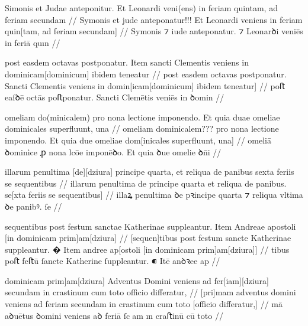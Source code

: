 \ex \bg
\gla
{}
Simonis et Judae anteponitur.
Et Leonardi veni(ens) in feriam quintam, ad feriam secundam
//
\glRekonstrukcja
{}
Symonis et jude anteponatur!!!
Et Leonardi veniens in feriam quin[tam, ad feriam secundam]
//
\glU
{}
Symonis ⁊ iude anteponatur. ⁊ Leonarꝺi veniēs in feriā quın   
//
\endgl
\eg


\ex \bg
\gla
{}
post easdem octavas postponatur.
Item sancti Clementis veniens in dominicam[dominicum] ibidem teneatur
//
\glRekonstrukcja
{}
post easdem octavas postponatur.
{} Sancti Clementis veniens in domin[icam[dominicum] ibidem teneatur]
//
\glU
{}
poﬅ eaſꝺē octās poﬅponatur. {} Sancti Clemētis veniēs in ꝺomin  
//
\endgl
\eg


\ex \bg
\gla
{}
omeliam do(minicalem) pro nona lectione imponendo. Et quia duae
omeliae dominicales superfluunt, una 
//
\glRekonstrukcja
{}
omeliam dominicalem??? pro nona lectione imponendo. Et quia due
omeliae dom[inicales superfluunt, una]
//
\glU
{}
omeliā ꝺominìce ꝓ nona lcōe imponēꝺo. Et quia ꝺue omelie ꝺn̄i  
//
\endgl
\eg




\ex \bg
\gla
{}
illarum penultima [de][dziura] principe
quarta, et reliqua de panibus sexta feriis se sequentibus
//
\glRekonstrukcja
{}
illarum penultima de principe
quarta et reliqua de panibus. se[xta feriis se sequentibus]
//
\glU
{}
illaꝝ penultima ꝺe pꝛincipe quarta ⁊ reliqua vltima ꝺe panibꝰ. ſe   
//
\endgl
\eg



\ex \bg
\gla
{}
sequentibus post festum
sanctae Katherinae suppleantur.
{} Item Andreae apostoli [in dominicam prim]am[dziura]
//
\glRekonstrukcja
{}
[sequen]tibus post festum
sancte Katherinae suppleantur.
� Item andree ap[ostoli [in dominicam prim]am[dziura]]
//
\glU
{}
tibus poﬅ feﬅū ſancte Katherine ſuppleantur. ⁌ Itē anꝺꝛee ap   
//
\endgl
\eg


\ex \bg
\gla
{}
dominicam prim]am[dziura] Adventus Domini
veniens ad fer[iam][dziura] secundam in crastinum cum toto officio differatur,
//
\glRekonstrukcja
{}
[pri]mam adventus domini
veniens ad feriam secundam in crastinum cum toto [officio differatur,]
//
\glU
{}
mā aꝺuētus ꝺomini veniens aꝺ feriā ſcam ın craﬅinū cū toto  
//
\endgl
\eg

